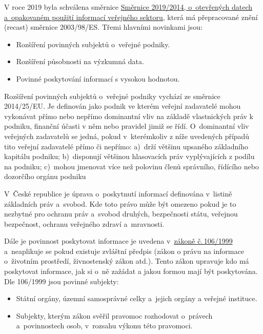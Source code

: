 V roce 2019 byla schválena směrnice \href{https://eur-lex.europa.eu/legal-content/CS/TXT/?uri=CELEX:32019L1024}{Směrnice 2019/2014, o~otevřených datech a~opakovaném použití informací veřejného sektoru}, která má přepracované znění (recast) směrnice 2003/98/ES. 
Třemi hlavními novinkami jsou:
\begin{itemize}[noitemsep]
    \item Rozšíření povinných subjektů o~veřejné podniky.
    \item Rozšíření působnosti na výzkumná data.
    \item Povinné poskytování informací s vysokou hodnotou.
\end{itemize}

Rozšíření povinných subjektů o~veřejné podniky vychází ze směrnice 2014/25/EU. Je definován jako podnik ve kterém veřejní zadavatelé mohou vykonávat přímo nebo nepřímo dominantní vliv na základě vlastnických práv k podniku, finanční účasti v něm nebo pravidel jimiž se řídí. O~dominantní vliv veřejných zadavatelů se jedná, pokud v~kterémkoliv z níže uvedených případů tito veřejní zadavatelé přímo či nepřímo: a)~drží většinu upsaného základního kapitálu podniku; b)~disponují většinou hlasovacích práv vyplývajících z podílu na podniku; c)~mohou jmenovat více než polovinu členů správního, řídícího nebo dozorčího orgánu podniku

V~České republice je úprava o~poskytnutí informací definována v~listině základních práv a~svobod. Kde toto právo může být omezeno pokud je to nezbytné pro ochranu práv a~svobod druhých, bezpečnosti státu, veřejnou bezpečnost, ochranu veřejného zdraví a~mravnosti. 

Dále je povinnost poskytovat informace je uvedena v~\href{https://www.zakonyprolidi.cz/cs/1999-106}{zákoně č.\,106/1999} a~neaplikuje se pokud existuje zvláštní předpis (zákon o právu na informace o~životním prostředí, živnostenský zákon atd.). Tento zákon upravuje kdo má poskytovat informace, jak si o~ně zažádat a jakou formou mají být poskytována. Dle 106/1999 jsou povinné subjekty:
\begin{itemize}[noitemsep]
    \item Státní orgány, územní samosprávné celky a~jejich orgány a veřejné instituce.
    \item Subjekty, kterým zákon svěřil pravomoc rozhodovat o~právech a~povinnostech osob, v~rozsahu výkonu této pravomoci.
\end{itemize}

